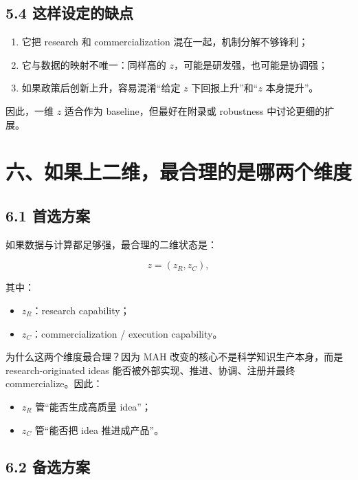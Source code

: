 \documentclass[12pt,fontset=none]{ctexart}
\begin{document}
\subsection{5.4 这样设定的缺点}

\begin{enumerate}[leftmargin=2em]
    \item 它把 research 和 commercialization 混在一起，机制分解不够锋利；
    \item 它与数据的映射不唯一：同样高的 \(z\)，可能是研发强，也可能是协调强；
    \item 如果政策后创新上升，容易混淆“给定 \(z\) 下回报上升”和“\(z\) 本身提升”。
\end{enumerate}

因此，一维 \(z\) 适合作为 baseline，但最好在附录或 robustness 中讨论更细的扩展。

\section{六、如果上二维，最合理的是哪两个维度}

\subsection{6.1 首选方案}

如果数据与计算都足够强，最合理的二维状态是：

\[
z=(z_R,z_C),
\]

其中：

\begin{itemize}[leftmargin=2em]
    \item \(z_R\)：research capability；
    \item \(z_C\)：commercialization / execution capability。
\end{itemize}

为什么这两个维度最合理？因为 MAH 改变的核心不是科学知识生产本身，而是 research-originated ideas 能否被外部实现、推进、协调、注册并最终 commercialize。因此：

\begin{itemize}[leftmargin=2em]
    \item \(z_R\) 管“能否生成高质量 idea”；
    \item \(z_C\) 管“能否把 idea 推进成产品”。
\end{itemize}

\subsection{6.2 备选方案}
\end{document}
